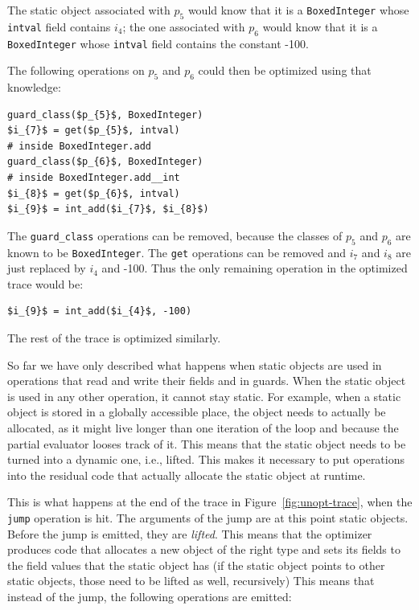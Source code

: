 \documentclass{sigplanconf}
\newcommand\ie{i.e.,\xspace}
\begin{document}
The static object associated with $p_{5}$ would know that it is a
\lstinline{BoxedInteger} whose \lstinline{intval} field contains $i_{4}$; the
one associated with $p_{6}$ would know that it is a \lstinline{BoxedInteger}
whose \lstinline{intval} field contains the constant -100.

The following operations on $p_{5}$ and $p_{6}$ could then be
optimized using that knowledge:

\begin{lstlisting}[mathescape,xleftmargin=20pt]
guard_class($p_{5}$, BoxedInteger)
$i_{7}$ = get($p_{5}$, intval)
# inside BoxedInteger.add
guard_class($p_{6}$, BoxedInteger)
# inside BoxedInteger.add__int
$i_{8}$ = get($p_{6}$, intval)
$i_{9}$ = int_add($i_{7}$, $i_{8}$)
\end{lstlisting}

The \lstinline{guard_class} operations can be removed, because the classes of $p_{5}$ and
$p_{6}$ are known to be \lstinline{BoxedInteger}. The \lstinline{get} operations can be removed
and $i_{7}$ and $i_{8}$ are just replaced by $i_{4}$ and -100. Thus the only
remaining operation in the optimized trace would be:

\begin{lstlisting}[mathescape,xleftmargin=20pt]
$i_{9}$ = int_add($i_{4}$, -100)
\end{lstlisting}

The rest of the trace is optimized similarly.

So far we have only described what happens when static objects are used in
operations that read and write their fields and in guards. When the static
object is used in any other operation, it cannot stay static. For example, when
a static object is stored in a globally accessible place, the object needs to
actually be allocated, as it might live longer than one iteration of the loop
and because the partial evaluator looses track of it. This means that the static
object needs to be turned into a dynamic one, \ie lifted. This makes it
necessary to put operations into the residual code that actually allocate the
static object at runtime.

This is what happens at the end of the trace in Figure~\ref{fig:unopt-trace}, when the \lstinline{jump} operation
is hit. The arguments of the jump are at this point static objects. Before the
jump is emitted, they are \emph{lifted}. This means that the optimizer produces code
that allocates a new object of the right type and sets its fields to the field
values that the static object has (if the static object points to other static
objects, those need to be lifted as well, recursively) This means that instead of the jump,
the following operations are emitted:
\end{document}
